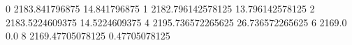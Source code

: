 0 2183.841796875 14.841796875
1 2182.796142578125 13.796142578125
2 2183.5224609375 14.5224609375
4 2195.736572265625 26.736572265625
6 2169.0 0.0
8 2169.47705078125 0.47705078125
